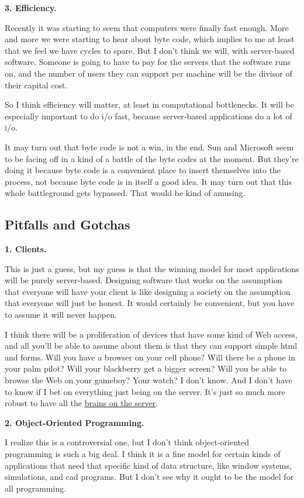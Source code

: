 \textbf{3. Efficiency.}

Recently it was starting to seem that computers were finally fast
enough. More and more we were starting to hear about byte code, which
implies to me at least that we feel we have cycles to spare. But I don't
think we will, with server-based software. Someone is going to have to
pay for the servers that the software runs on, and the number of users
they can support per machine will be the divisor of their capital cost.

So I think efficiency will matter, at least in computational
bottlenecks. It will be especially important to do i/o fast, because
server-based applications do a lot of i/o.

It may turn out that byte code is not a win, in the end. Sun and
Microsoft seem to be facing off in a kind of a battle of the byte codes
at the moment. But they're doing it because byte code is a convenient
place to insert themselves into the process, not because byte code is in
itself a good idea. It may turn out that this whole battleground gets
bypassed. That would be kind of amusing.

\subsection{Pitfalls and Gotchas}\label{pitfalls-and-gotchas}

\textbf{1. Clients.}

This is just a guess, but my guess is that the winning model for most
applications will be purely server-based. Designing software that works
on the assumption that everyone will have your client is like designing
a society on the assumption that everyone will just be honest. It would
certainly be convenient, but you have to assume it will never happen.

I think there will be a proliferation of devices that have some kind of
Web access, and all you'll be able to assume about them is that they can
support simple html and forms. Will you have a browser on your cell
phone? Will there be a phone in your palm pilot? Will your blackberry
get a bigger screen? Will you be able to browse the Web on your gameboy?
Your watch? I don't know. And I don't have to know if I bet on
everything just being on the server. It's just so much more robust to
have all the \href{road.html}{brains on the server}.

\textbf{2. Object-Oriented Programming.}

I realize this is a controversial one, but I don't think object-oriented
programming is such a big deal. I think it is a fine model for certain
kinds of applications that need that specific kind of data structure,
like window systems, simulations, and cad programs. But I don't see why
it ought to be the model for all programming.

